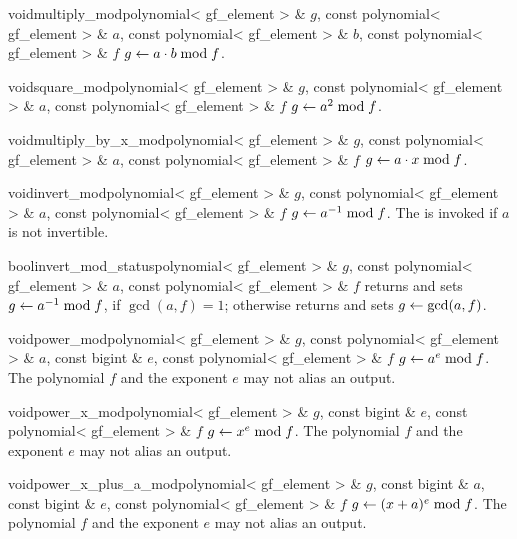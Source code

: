 
\begin{fcode}{void}{multiply_mod}{polynomial< gf_element > & $g$,
    const polynomial< gf_element > & $a$, const polynomial< gf_element > & $b$,
    const polynomial< gf_element > & $f$}%
  $g \leftarrow a \cdot b \bmod f$.
\end{fcode}

\begin{fcode}{void}{square_mod}{polynomial< gf_element > & $g$,
    const polynomial< gf_element > & $a$, const polynomial< gf_element > & $f$}%
  $g \leftarrow a^2 \bmod f$.
\end{fcode}

\begin{fcode}{void}{multiply_by_x_mod}{polynomial< gf_element > & $g$,
    const polynomial< gf_element > & $a$, const polynomial< gf_element > & $f$}%
  $g \leftarrow a \cdot x \bmod f$.
\end{fcode}

\begin{fcode}{void}{invert_mod}{polynomial< gf_element > & $g$,
    const polynomial< gf_element > & $a$, const polynomial< gf_element > & $f$}%
  $g \leftarrow a^{-1} \bmod f$.  The \LEH is invoked if $a$ is not invertible.
\end{fcode}

\begin{fcode}{bool}{invert_mod_status}{polynomial< gf_element > & $g$,
    const polynomial< gf_element > & $a$, const polynomial< gf_element > & $f$}%
  returns \TRUE and sets $g \leftarrow a^{-1} \bmod f$, if $\gcd(a, f) = 1$; otherwise returns
  \FALSE and sets $g \leftarrow \gcd(a, f)$.
\end{fcode}

\begin{fcode}{void}{power_mod}{polynomial< gf_element > & $g$,
    const polynomial< gf_element > & $a$, const bigint & $e$,
    const polynomial< gf_element > & $f$}%
  $g \leftarrow a^e \bmod f$.  The polynomial $f$ and the exponent $e$ may not alias an output.
\end{fcode}

\begin{fcode}{void}{power_x_mod}{polynomial< gf_element > & $g$, const bigint & $e$,
    const polynomial< gf_element > & $f$}%
  $g \leftarrow x^e \bmod f$.  The polynomial $f$ and the exponent $e$ may not alias an output.
\end{fcode}

\begin{fcode}{void}{power_x_plus_a_mod}{polynomial< gf_element > & $g$, const bigint & $a$,
    const bigint & $e$, const polynomial< gf_element > & $f$}%
  $g \leftarrow (x + a)^e \bmod f$.  The polynomial $f$ and the exponent $e$ may not alias an
  output.
\end{fcode}


